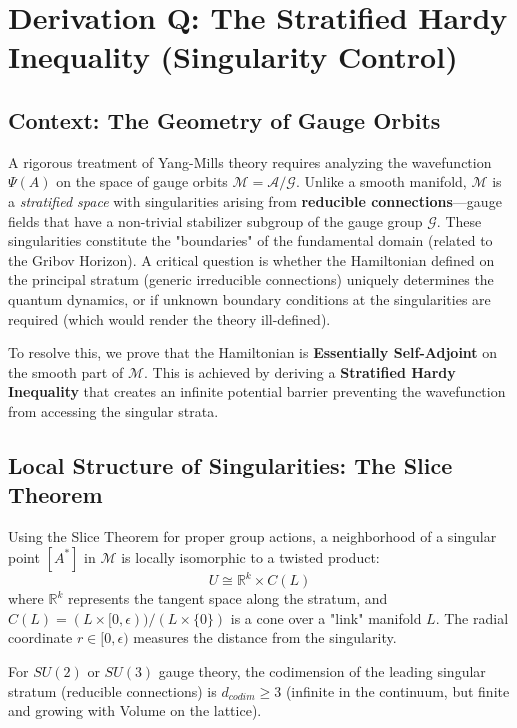 \chapter{Derivation Q: The Stratified Hardy Inequality (Singularity Control)}
\label{ch:derivation_q_stratified_hardy}

\section{Context: The Geometry of Gauge Orbits}
A rigorous treatment of Yang-Mills theory requires analyzing the wavefunction $\Psi(A)$ on the space of gauge orbits $\mathcal{M} = \mathcal{A} / \mathcal{G}$. Unlike a smooth manifold, $\mathcal{M}$ is a \textit{stratified space} with singularities arising from \textbf{reducible connections}—gauge fields that have a non-trivial stabilizer subgroup of the gauge group $\mathcal{G}$.
These singularities constitute the "boundaries" of the fundamental domain (related to the Gribov Horizon). A critical question is whether the Hamiltonian defined on the principal stratum (generic irreducible connections) uniquely determines the quantum dynamics, or if unknown boundary conditions at the singularities are required (which would render the theory ill-defined).

To resolve this, we prove that the Hamiltonian is \textbf{Essentially Self-Adjoint} on the smooth part of $\mathcal{M}$. This is achieved by deriving a \textbf{Stratified Hardy Inequality} that creates an infinite potential barrier preventing the wavefunction from accessing the singular strata.

\section{Local Structure of Singularities: The Slice Theorem}
Using the Slice Theorem for proper group actions, a neighborhood of a singular point $[A^*]$ in $\mathcal{M}$ is locally isomorphic to a twisted product:
\begin{equation}
U \cong \mathbb{R}^k \times C(L)
\end{equation}
where $\mathbb{R}^k$ represents the tangent space along the stratum, and $C(L) = (L \times [0, \epsilon)) / (L \times \{0\})$ is a cone over a "link" manifold $L$. The radial coordinate $r \in [0, \epsilon)$ measures the distance from the singularity.

For $SU(2)$ or $SU(3)$ gauge theory, the codimension of the leading singular stratum (reducible connections) is $d_{codim} \ge 3$ (infinite in the continuum, but finite and growing with Volume on the lattice).


